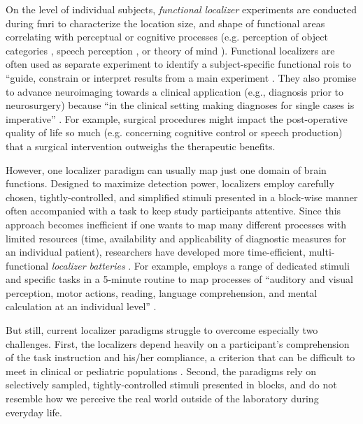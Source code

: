 
On the level of individual subjects, \textit{functional localizer} experiments
\citep[e.g.,][for reviews]{saxe2006divide, friston2006critique} are conducted
during \ac{fmri} to characterize the location size, and shape of functional
areas correlating with perceptual or cognitive processes (e.g. perception of
object categories \citep{kanwisher1997ffa}, speech perception
\citep{fernandez2001language}, or theory of mind \citep{spunt2014validating}).
Functional localizers are often used as separate experiment to identify a
subject-specific functional \acp{roi} to ``guide, constrain or interpret results
from a main experiment \citep{saxe2006divide}.
They also promise to advance neuroimaging towards a clinical application (e.g.,
diagnosis prior to neurosurgery) because ``in the clinical setting making
diagnoses for single cases is imperative'' \citep{wegrzyn2018thought}.
For example, surgical procedures might impact the post-operative quality of life
so much (e.g. concerning cognitive control or speech production) that a surgical
intervention outweighs the therapeutic benefits.

However, one localizer paradigm can usually map just one domain of brain
functions.
Designed to maximize detection power, localizers employ carefully chosen,
tightly-controlled, and simplified stimuli presented in a block-wise manner
often accompanied with a task to keep study participants attentive.
Since this approach becomes inefficient if one wants to map many different
processes with limited resources (time, availability and applicability of
diagnostic measures for an individual patient), researchers have developed more
time-efficient, multi-functional \textit{localizer batteries}
\citep{barch2013function, drobyshevsky2006rapid, pinho2018individual,
pinho2020individual, pinel2007fast}.
For example, \citet{pinel2007fast} employs a range of dedicated stimuli and
specific tasks in a 5-minute routine to map processes of ``auditory and visual
perception, motor actions, reading, language comprehension, and mental
calculation at an individual level'' \citep{pinel2007fast}.

But still, current localizer paradigms struggle to overcome especially two
challenges.
%
First, the localizers depend heavily on a participant's comprehension of the
task instruction and his/her compliance, a criterion that can be difficult to
meet in clinical or pediatric populations \citep{eickhoff2020towards,
vanderwal2015inscapes, vanderwal2019movies}.
Second, the paradigms rely on selectively sampled, tightly-controlled stimuli
presented in blocks, and do not resemble how we perceive the real world outside
of the laboratory during everyday life.


